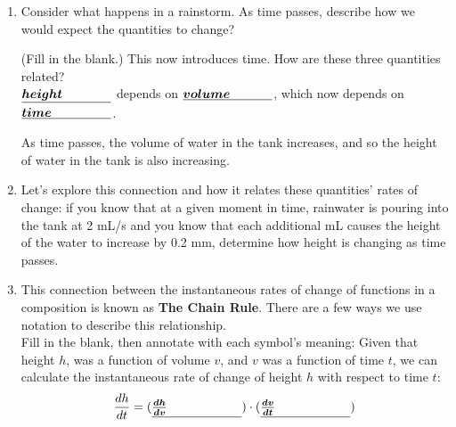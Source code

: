 \documentclass{article}
\begin{document}
\begin{enumerate}
\begin{enumerate}
  $\fitb{1in}{height}$ depends on $\fitb{1in}{height}$.

  \item Consider what happens in a rainstorm. As time passes, describe how we would expect the quantities to change?

  \begin{problemonly}
      \vfill
  \end{problemonly}
  (Fill in the blank.) This now introduces time. How are these three quantities related? \\
  
  $\fitb{1in}{height}$ depends on $\fitb{1in}{volume}$, which now depends  on $\fitb{1in}{time}$.

  \begin{solution} As time passes, the volume of water in the tank increases, and so the height of water in the tank is also increasing.
  \end{solution}


  \item Let's explore this connection and how it relates these quantities' rates of change: if you know that at a given moment in time, rainwater is pouring into the tank at 2 mL/s and you know that each additional mL causes the height of the water to increase by 0.2 mm, determine how height is changing as time passes.
  \begin{problemonly}
      \vfill
  \end{problemonly}

  \begin{solution}
      
  \end{solution}
 
  \item This connection between the instantaneous rates of change of functions in a composition is known as {\bf The Chain Rule}.  There are a few ways we use notation to describe this relationship.  \\

  Fill in the blank, then annotate with each symbol's meaning: 
  Given that height $h$, was a function of volume $v$, and $v$ was a function of time $t$, we can calculate the instantaneous rate of change of height $h$ with respect to time $t$:
  $$\displaystyle \frac{dh}{dt} = (\fitb{1in}{\frac{dh}{dv}})\cdot (\fitb{1in}{\frac{dv}{dt}})$$
  \begin{problemonly}
 \vspace{.5in}
 \end{problemonly}


\end{enumerate}
\end{enumerate}
\end{document}
